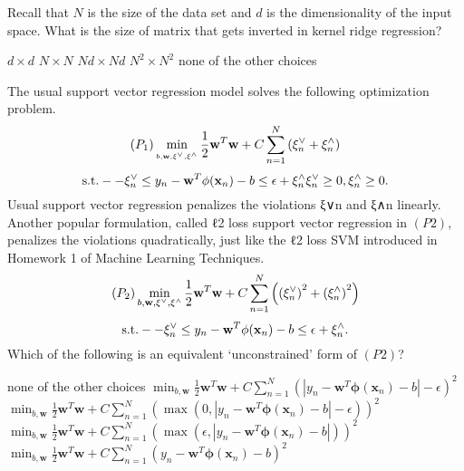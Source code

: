 \documentclass[a4paper,10pt]{exam}
\begin{document}
\begin{questions}
	\question Recall that $N$ is the size of the data set and $d$ is the dimensionality of the input space. What is the size of matrix that gets inverted in kernel ridge regression?
	\begin{choices}
	\choice $d \times d$
	\CorrectChoice $N \times N$
	\choice $Nd \times Nd$
	\choice $N^2 \times N^2$
	\choice none of the other choices\\
	\end{choices}
	
	\question The usual support vector regression model solves the following optimization problem.
\[({P_1})\mathop {\min }\limits_{_{b,{\bf{w}},{{\bf{\xi }}^ \vee },{{\bf{\xi }}^ \wedge }}} \frac{1}{2}{{\bf{w}}^T}{\bf{w}} + C\sum\limits_{n = 1}^N {\left( {\xi _n^ \vee  + \xi _n^ \wedge } \right)}\]\[ {\rm{  s}}.{\rm{t}}. -  - \xi _n^ \vee  \le {y_n} - {{\bf{w}}^T}\phi ({{\bf{x}}_n}) - b \le \epsilon + \xi _n^ \wedge \xi _n^ \vee  \ge 0,\xi _n^ \wedge  \ge 0.\]
Usual support vector regression penalizes the violations ξ∨n and ξ∧n linearly. Another popular formulation, called ℓ2 loss support vector regression in $(P2)$, penalizes the violations quadratically, just like the ℓ2 loss SVM introduced in Homework 1 of Machine Learning Techniques.
\[({P_2})\mathop {\min }\limits_{b,{\bf{w}},{{\bf{\xi }}^ \vee },{{\bf{\xi }}^ \wedge }} \frac{1}{2}{{\bf{w}}^T}{\bf{w}} + C\sum\limits_{n = 1}^N {\left( {{{(\xi _n^ \vee )}^2} + {{(\xi _n^ \wedge )}^2}} \right)} \]
\[{\rm{s}}.{\rm{t}}. -  - \xi _n^ \vee  \le {y_n} - {{\bf{w}}^T}\phi ({{\bf{x}}_n}) - b \le \epsilon  + \xi _n^ \wedge .\]
Which of the following is an equivalent `unconstrained' form of $(P2)$?

\begin{choices}
	\choice none of the other choices
	\choice $\min_{b, \mathbf{w}} \frac{1}{2} \mathbf{w}^T \mathbf{w} + C \sum_{n=1}^N (|y_n - \mathbf{w}^T \mathbf{\phi}(\mathbf{x}_n) - b| - \epsilon)^2$
	\CorrectChoice $\min_{b, \mathbf{w}} \frac{1}{2} \mathbf{w}^T \mathbf{w} + C \sum_{n=1}^N (\max(0, |y_n - \mathbf{w}^T \mathbf{\phi}(\mathbf{x}_n) - b| - \epsilon))^2$\
	\choice $\min_{b, \mathbf{w}} \frac{1}{2} \mathbf{w}^T \mathbf{w} + C \sum_{n=1}^N (\max(\epsilon, |y_n - \mathbf{w}^T \mathbf{\phi}(\mathbf{x}_n) - b|    ))^2$
	\choice $\min_{b, \mathbf{w}} \frac{1}{2} \mathbf{w}^T \mathbf{w} + C \sum_{n=1}^N (y_n - \mathbf{w}^T \mathbf{\phi}(\mathbf{x}_n) - b)^2$\\
\end{choices}	


\end{questions}
\end{document}
